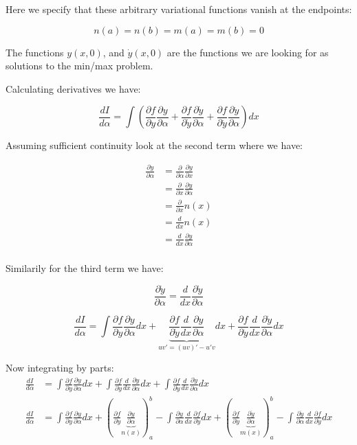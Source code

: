 \documentclass{article}
\newcommand{\ydot}[0]{\dot{y}}
\newcommand{\yddot}[0]{\ddot{y}}
\newcommand{\PD}[2]{\frac{\partial {#2}}{\partial {#1}}}
\begin{document}
Here we specify that these arbitrary variational functions vanish at the endpoints:

\begin{equation*}
n(a) = n(b) = m(a) = m(b) = 0
\end{equation*}

The functions $y(x, 0)$, and $\ydot(x, 0)$ are the functions we are looking for as solutions to the min/max problem.

Calculating derivatives we have:

\begin{equation*}
\frac{dI}{d\alpha} = 
\int \left( 
\PD{y}{f} \PD{\alpha}{y}
+\PD{\ydot}{f} \PD{\alpha}{\ydot}
+\PD{\yddot}{f} \PD{\alpha}{\yddot}
\right) d x
\end{equation*}

Assuming sufficient continuity look at the second term where we have:

\begin{align*}
\PD{\alpha}{\ydot} 
&= \PD{\alpha}{} \PD{x}{y} \\
&= \PD{x}{} \PD{\alpha}{y} \\
&= \PD{x}{} n(x) \\
&= \frac{d}{ d x} n(x) \\
&= \frac{d}{ d x} \PD{\alpha}{y} \\
\end{align*}

Similarily for the third term we have:

\begin{equation*}
\PD{\alpha}{\ydot} = \frac{d}{ d x} \PD{\alpha}{\ydot}
\end{equation*}

\begin{equation*}
\frac{dI}{d\alpha} = 
\int \PD{y}{f} \PD{\alpha}{y} d x +
\underbrace{\PD{\ydot}{f} \frac{d}{ d x} \PD{\alpha}{y}}_{ u v' = (u v)' - u' v } d x
+\PD{\yddot}{f} \frac{d}{ d x} \PD{\alpha}{\ydot} d x
\end{equation*}

Now integrating by parts:
\begin{align*}
\frac{dI}{d\alpha} &= 
 \int \PD{y}{f} \PD{\alpha}{y} d x
+\int \PD{\ydot}{f} \frac{d}{ d x} \PD{\alpha}{y} d x
+\int \PD{\yddot}{f} \frac{d}{ d x} \PD{\alpha}{\ydot} d x \\
\frac{dI}{d\alpha} &= 
 \int \PD{y}{f} \PD{\alpha}{y} d x
+\left(\PD{\ydot}{f} \underbrace{\PD{\alpha}{y}}_{n(x)}\right)_a^b - \int \PD{\alpha}{y} \frac{d}{ d x} \PD{\ydot}{f} d x
+\left(\PD{\yddot}{f} \underbrace{\PD{\alpha}{\ydot}}_{m(x)} \right)_a^b
-\int \PD{\alpha}{\ydot} \frac{d}{ d x} \PD{\yddot}{f} d x
\end{align*}
\end{document}

